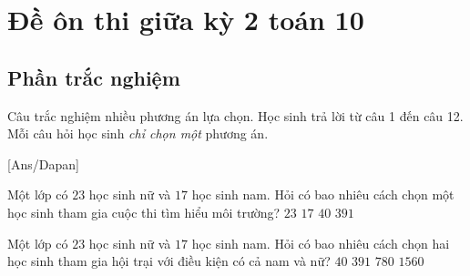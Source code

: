 \section{Đề ôn thi giữa kỳ 2 toán 10}
\subsection{Phần trắc nghiệm}
Câu trắc nghiệm nhiều phương án lựa chọn. Học sinh trả lời từ
câu 1 đến câu 12. Mỗi câu hỏi học sinh \textit{chỉ chọn một} phương án.

[Ans/Dapan]
\hienthiloigiaiex
\begin{ex}%
	Một lớp có $23$ học sinh nữ và $17$ học sinh nam. Hỏi có bao nhiêu cách chọn một học sinh tham gia cuộc thi tìm hiểu môi trường?
	\choice
	{$23$}
	{$17$}
	{\True$40$}
	{$391$}
\end{ex}
\begin{ex}%
	Một lớp có $23$ học sinh nữ và $17$ học sinh nam. Hỏi có bao nhiêu cách chọn hai học sinh tham gia hội trại với điều kiện có cả nam và nữ?
	\choice
	{$40$}
	{\True$391$}
	{$780$}
	{$1560$}
\end{ex}  
